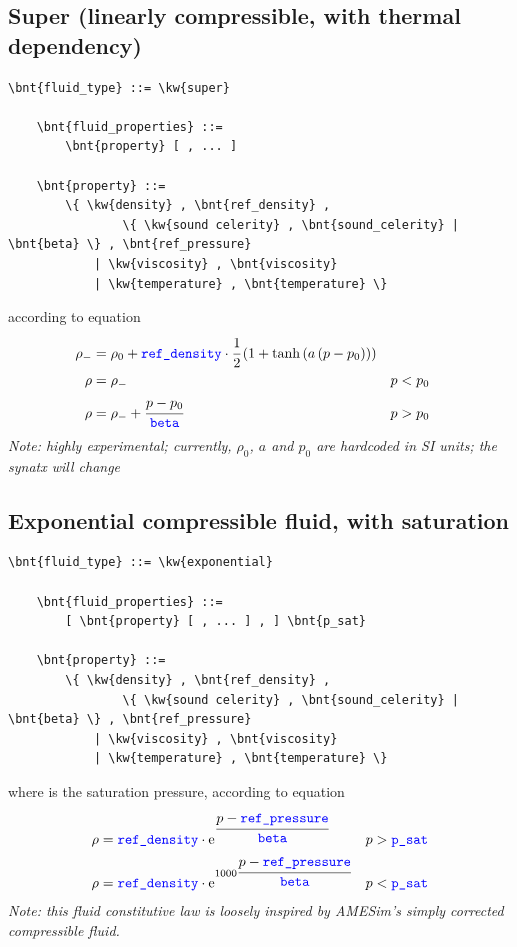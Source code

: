 \subsection{Super (linearly compressible, with thermal dependency)}
\begin{Verbatim}[commandchars=\\\{\}]
    \bnt{fluid_type} ::= \kw{super}

    \bnt{fluid_properties} ::= 
        \bnt{property} [ , ... ]

    \bnt{property} ::=
        \{ \kw{density} , \bnt{ref_density} ,
                \{ \kw{sound celerity} , \bnt{sound_celerity} | \bnt{beta} \} , \bnt{ref_pressure}
            | \kw{viscosity} , \bnt{viscosity}
            | \kw{temperature} , \bnt{temperature} \}
\end{Verbatim}
according to equation
\begin{align}
	\rho_-
	&=
	\rho_0 + \textcolor{blue}{\texttt{ref\_density}} \cdot \cfrac{1}{2}\left( 
		1 + \tanh\left( a\left( p - p_0 \right) \right)
	 \right)
	\nonumber \\
	\rho
	&=
	\rho_-
		& p &< p_0
	\\
	\rho
	&=
	\rho_- + \cfrac{p - p_0}{\textcolor{blue}{\texttt{beta}}}
		& p &> p_0
	\nonumber
\end{align}
\emph{Note: highly experimental; currently, $\rho_0$, $a$ and $p_0$
are hardcoded in SI units; the synatx will change}

\subsection{Exponential compressible fluid, with saturation}
\begin{Verbatim}[commandchars=\\\{\}]
    \bnt{fluid_type} ::= \kw{exponential}

    \bnt{fluid_properties} ::= 
        [ \bnt{property} [ , ... ] , ] \bnt{p_sat}

    \bnt{property} ::=
        \{ \kw{density} , \bnt{ref_density} ,
                \{ \kw{sound celerity} , \bnt{sound_celerity} | \bnt{beta} \} , \bnt{ref_pressure}
            | \kw{viscosity} , \bnt{viscosity}
            | \kw{temperature} , \bnt{temperature} \}
\end{Verbatim}
where  is the saturation pressure, according to equation
\begin{align}
	\rho &= \textcolor{blue}{\texttt{ref\_density}} \cdot \text{e}^{\cfrac{p - \textcolor{blue}{\texttt{ref\_pressure}}}{\textcolor{blue}{\texttt{beta}}}}
		& p &> \textcolor{blue}{\texttt{p\_sat}}
	\nonumber \\
	\rho &= \textcolor{blue}{\texttt{ref\_density}} \cdot \text{e}^{1000\cfrac{p - \textcolor{blue}{\texttt{ref\_pressure}}}{\textcolor{blue}{\texttt{beta}}}}
		& p &< \textcolor{blue}{\texttt{p\_sat}}
\end{align}
\emph{Note: this fluid constitutive law is loosely inspired by AMESim's
simply corrected compressible fluid.}



